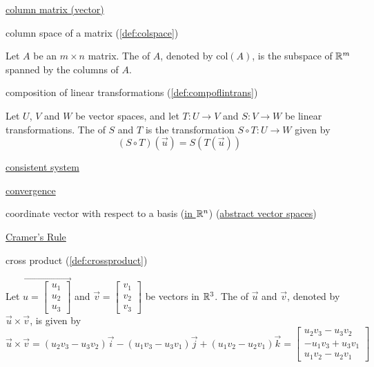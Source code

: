 \documentclass{ximera}
\begin{document}

\href{https://ximera.osu.edu/oerlinalg/LinearAlgebra/MAT-0010/main}{column matrix (vector)}

column space of a matrix (\ref{def:colspace})
\begin{expandable}
    Let $A$ be an $m\times n$ matrix.  The  of $A$, denoted by $\mbox{col}(A)$, is the subspace of $\mathbb{R}^m$ spanned by the columns of $A$.
\end{expandable}

composition of linear transformations (\ref{def:compoflintrans})
\begin{expandable}
    Let $U$, $V$ and $W$ be vector spaces, and let $T:U\rightarrow V$ and $S:V\rightarrow W$ be linear transformations.  The  of $S$ and $T$ is the transformation $S\circ T:U\rightarrow W$ given by
$$(S\circ T)(\vec{u})=S(T(\vec{u}))$$
\end{expandable}

\href{https://ximera.osu.edu/oerlinalg/LinearAlgebra/SYS-0010/main}{consistent system}

\href{https://ximera.osu.edu/oerlinalg/LinearAlgebra/SYS-0040/main}{convergence}

coordinate vector with respect to a basis (\href{https://ximera.osu.edu/oerlinalg/LinearAlgebra/VSP-0030/main}{in $\mathbb{R}^n$}) (\href{https://ximera.osu.edu/oerlinalg/LinearAlgebra/VSP-0060/main}{abstract vector spaces})

\href{https://ximera.osu.edu/oerlinalg/LinearAlgebra/DET-0060/main}{Cramer's Rule}

cross product (\ref{def:crossproduct})
\begin{expandable}
    Let $\vec{u=\begin{bmatrix}u_1\\u_2\\u_3\end{bmatrix}}$ and $\vec{v}=\begin{bmatrix}v_1\\v_2\\v_3\end{bmatrix}$ be vectors in $\mathbb{R}^3$.  The  of $\vec{u}$ and $\vec{v}$, denoted by $\vec{u}\times\vec{v}$, is given by
$$\vec{u}\times\vec{v}=(u_2v_3-u_3v_2)\vec{i}-(u_1v_3-u_3v_1)\vec{j}+(u_1v_2-u_2v_1)\vec{k}
=\begin{bmatrix}u_2v_3-u_3v_2\\-u_1v_3+u_3v_1\\u_1v_2-u_2v_1\end{bmatrix}$$
\end{expandable}
\end{document}
